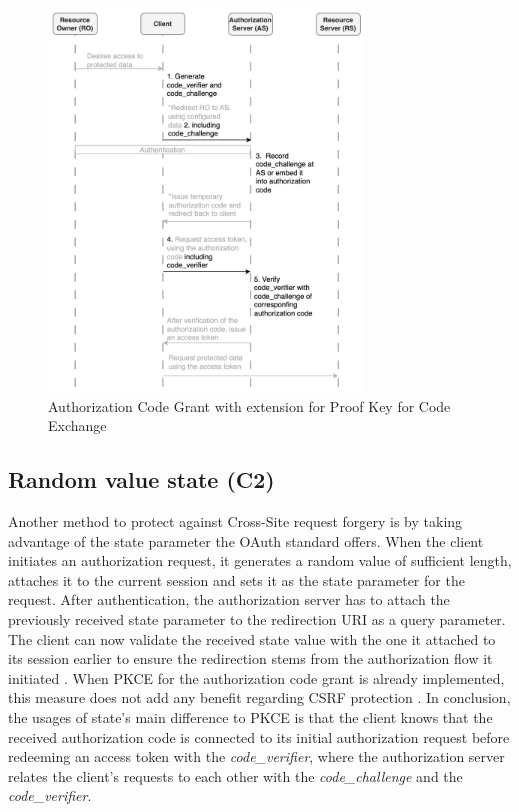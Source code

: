 \begin{figure}[H]
	\sffamily\footnotesize
	\includegraphics[width=0.75\textwidth]{pic/PKCE.png}
	\unitlength=0.75mm
	\linethickness{0.4pt}
	\caption{Authorization Code Grant with extension for Proof Key for Code Exchange}
	\label{fig:pkce}
\end{figure}

\subsection[Random value state]{Random value state (C2)}
\label{counter:C2}
Another method to protect against Cross-Site request forgery is by taking advantage of the state parameter the OAuth standard offers. When the client initiates an authorization request, it generates a random value of sufficient length, attaches it to the current session and sets it as the state parameter for the request. After authentication, the authorization server has to attach the previously received state parameter to the redirection URI as a query parameter. The client can now validate the received state value with the one it attached to its session earlier to ensure the redirection stems from the authorization flow it initiated \cite{ferry2015security}. When PKCE for the authorization code grant is already implemented, this measure does not add any benefit regarding CSRF protection \cite{bradley2015rfc}. In conclusion, the usages of state's main difference to PKCE is that the client knows that the received authorization code is connected to its initial authorization request before redeeming an access token with the \emph{code\_verifier}, where the authorization server relates the client's requests to each other with the \emph{code\_challenge} and the \emph{code\_verifier}.


